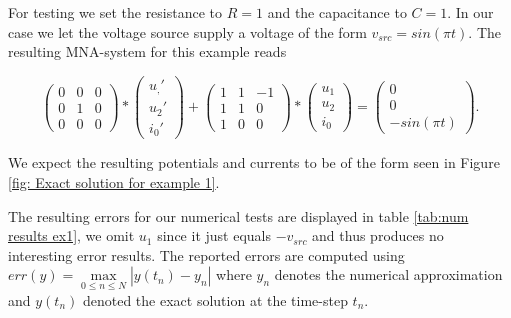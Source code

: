 \begin{example1}
	For testing we set the resistance to $R=1$ and the capacitance to $C=1$. In our case we let the  voltage source supply a voltage of the form $v_{src} = sin(\pi t)$. The resulting MNA-system for this example reads
	
	\begin{equation}
		\label{eq:MNA-system of chargin capacitor with explicit values}
		\begin{pmatrix}
			0 & 0 & 0 \\
			0 & 1 & 0 \\
			0 & 0 & 0
		\end{pmatrix}
		*
		\begin{pmatrix}
			u_,' \\
			u_2' \\
			i_0'
		\end{pmatrix}
		+
		\begin{pmatrix}
			1 & 1 & -1 \\
			1 & 1 & 0 \\
			1 & 0 & 0 
		\end{pmatrix}
		*
		\begin{pmatrix}
			u_1 \\
			u_2 \\
			i_0
		\end{pmatrix}
		=
		\begin{pmatrix}
			0 \\
			0 \\
			-sin(\pi t)
		\end{pmatrix}.
	\end{equation}
		
	We expect the resulting potentials and currents to be of the form seen in Figure \ref{fig: Exact solution for example 1}.

	The resulting errors for our numerical tests are displayed in table \ref{tab:num results ex1}, we omit $u_1$ since it just equals $-v_{src}$ and thus produces no interesting error results. The reported errors are computed using $err(y) = \max\limits_{0 \leq n \leq N} | y(t_n) - y_n |$ where $y_n$ denotes the numerical approximation and $y(t_n)$ denoted the exact solution at the time-step $t_n$. 
	

\end{example1}
